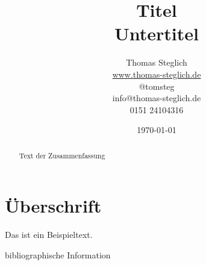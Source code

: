 \documentclass[11pt,a4paper]{scrartcl}
\begin{document}
\graphicspath{{./images/}} %

\title{Titel\\ \small Untertitel}
\author{Thomas Steglich\\
\small \url{www.thomas-steglich.de}\\
\small @tomsteg\\
\small info@thomas-steglich.de\\
\small 0151 24104316}
\date{\today}

\maketitle

\begin{abstract}
\noindent Text der Zusammenfassung
\end{abstract}

\pagestyle{fancy} %
\lhead{\leftmark} %
\chead{} %
\rhead{\rightmark} %
\cfoot{\thepage} %
\rfoot{\today} %
\renewcommand\headrulewidth{1pt} %
\renewcommand\footrulewidth{1pt} %

\newpage %
\tableofcontents %
\newpage %

\section{Überschrift}

Das ist ein Beispieltext\cite[Text]{zitierschluessel}.

\nocite{*} %

\begin{thebibliography}{\hspace{1cm}}
	 bibliographische Information
\end{thebibliography}
\end{document}
